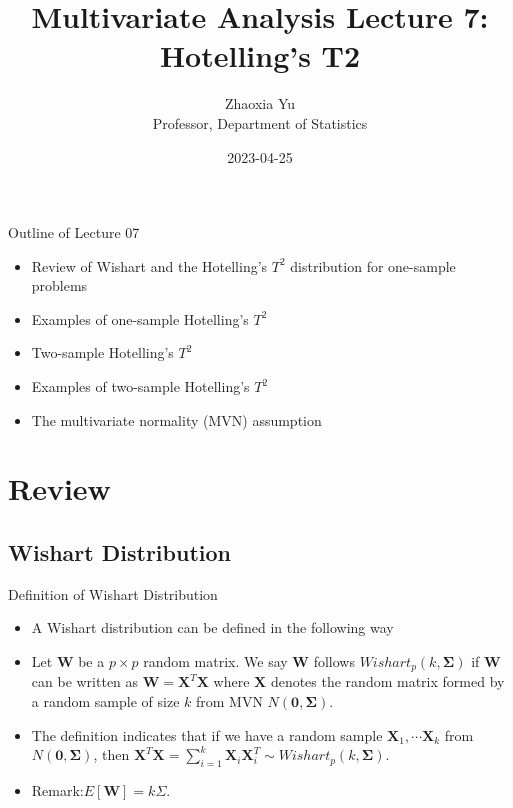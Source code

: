 \documentclass[
  ignorenonframetext,
]{beamer}
\title{Multivariate Analysis Lecture 7: Hotelling's T2}
\author{Zhaoxia Yu\\
Professor, Department of Statistics}
\date{2023-04-25}
\providecommand{\tightlist}{%
  \setlength{\itemsep}{0pt}\setlength{\parskip}{0pt}}
\begin{document}
\frame{\titlepage}

\begin{frame}{Outline of Lecture 07}
\protect\hypertarget{outline-of-lecture-07}{}
\begin{itemize}
\tightlist
\item
  Review of Wishart and the Hotelling's \(T^2\) distribution for
  one-sample problems
\item
  Examples of one-sample Hotelling's \(T^2\)
\item
  Two-sample Hotelling's \(T^2\)
\item
  Examples of two-sample Hotelling's \(T^2\)
\item
  The multivariate normality (MVN) assumption
\end{itemize}
\end{frame}

\hypertarget{review}{%
\section{Review}\label{review}}

\hypertarget{wishart-distribution}{%
\subsection{Wishart Distribution}\label{wishart-distribution}}

\begin{frame}{Definition of Wishart Distribution}
\protect\hypertarget{definition-of-wishart-distribution}{}
\begin{itemize}
\item
  A Wishart distribution can be defined in the following way
\item
  Let \(\mathbf W\) be a \(p\times p\) random matrix. We say
  \(\mathbf W\) follows \(Wishart_{p}(k, \boldsymbol \Sigma)\) if
  \(\mathbf W\) can be written as \(\mathbf W=\mathbf X^T \mathbf X\)
  where \(\mathbf X\) denotes the random matrix formed by a random
  sample of size \(k\) from MVN \(N(\mathbf 0, \boldsymbol \Sigma)\).
\item
  The definition indicates that if we have a random sample
  \(\mathbf X_1, \cdots \mathbf X_k\) from
  \(N(\mathbf 0, \boldsymbol \Sigma)\), then
  \(\mathbf X^T \mathbf X=\sum_{i=1}^k \mathbf X_i \mathbf X_i^T \sim Wishart_p(k, \boldsymbol \Sigma)\).
\item
  Remark:\(E[\mathbf W]=k\Sigma\).
\end{itemize}
\end{frame}
\end{document}

